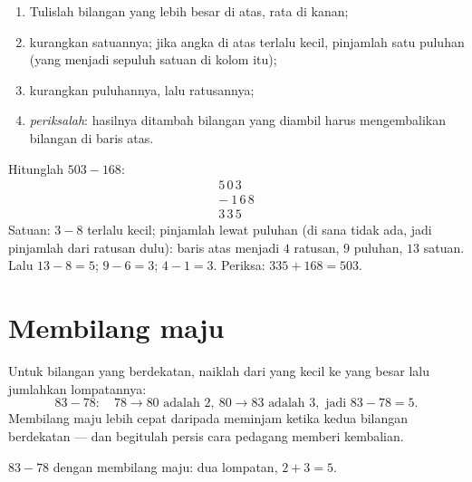 \begin{method}\label{met:g2:subtraction:column}
\begin{enumerate}
  \item Tulislah bilangan yang lebih besar di atas, rata di kanan;
  \item kurangkan satuannya; jika angka di atas terlalu kecil,
        pinjamlah satu puluhan (yang menjadi sepuluh satuan di kolom
        itu);
  \item kurangkan puluhannya, lalu ratusannya;
  \item \emph{periksalah}: hasilnya ditambah bilangan yang diambil
        harus mengembalikan bilangan di baris atas.
\end{enumerate}
\end{method}

\begin{example}\label{ex:g2:subtraction:worked}
Hitunglah $503 - 168$:
\[
\begin{array}{r}
5\,0\,3 \\
-\ 1\,6\,8 \\
\hline
3\,3\,5
\end{array}
\]
Satuan: $3 - 8$ terlalu kecil; pinjamlah lewat puluhan (di sana tidak
ada, jadi pinjamlah dari ratusan dulu): baris atas menjadi $4$
ratusan, $9$ puluhan, $13$ satuan. Lalu $13 - 8 = 5$; $9 - 6 = 3$;
$4 - 1 = 3$. Periksa: $335 + 168 = 503$. \checkmark
\end{example}

\section{Membilang maju}

\begin{method}\label{met:g2:subtraction:countup}
Untuk bilangan yang berdekatan, naiklah dari yang kecil ke yang
besar lalu jumlahkan lompatannya:
\[
83 - 78: \quad 78 \to 80 \text{ adalah } 2, \ 80 \to 83 \text{ adalah } 3,
\text{ jadi } 83 - 78 = 5 .
\]
Membilang maju lebih cepat daripada meminjam ketika kedua bilangan
berdekatan --- dan begitulah persis cara pedagang memberi kembalian.
\end{method}

\begin{omfigure}

{\small $83 - 78$ dengan membilang maju: dua lompatan, $2 + 3 = 5$.}
\end{omfigure}

